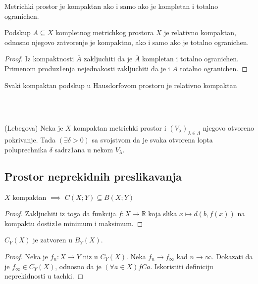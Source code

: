 \documentclass[a4paper,12pt]{article}
\newcommand{\RR}{\mathbb{R}}
\newcommand{\psj}{\subseteq}
\begin{document}
\begin{posl}
Metrichki prostor je kompaktan ako i samo ako je kompletan i totalno ogranichen.
\end{posl}

\begin{tvr}
Podskup $A \psj X$ kompletnog metrichkog prostora $X$ je relativno kompaktan, odnosno njegovo zatvorenje je kompaktno, ako i samo ako je totalno ogranichen.
\end{tvr}
\begin{proof}
Iz kompaktnosti $\overline{A}$ zakljuchiti da je $\overline{A}$ kompletan i totalno ogranichen. Primenom produz1enja nejednakosti zakljuchiti da je i $A$ totalno ogranichen.
\end{proof}

\begin{nap}
Svaki kompaktan podskup u Hausdorfovom prostoru je relativno kompaktan
\end{nap}
\\ \\
\begin{lema}(Lebegova)
Neka je $X$ kompaktan metrichki prostor i $(V_{\lambda})_{\lambda \in \Lambda}$ njegovo otvoreno pokrivanje. Tada $(\exists \delta > 0)$ sa svojstvom da je svaka otvorena lopta poluprechnika $\delta$ sadrz1ana u nekom $V_{\lambda}$.
\end{lema}

\subsection{Prostor neprekidnih preslikavanja}

\begin{tvr}
$X$ kompaktan $\implies$ $C(X;Y) \psj B(X;Y)$
\end{tvr}
\begin{proof}
Zakljuchiti iz toga da funkcija $f:X \to \RR$ koja slika $x\mapsto d(b,f(x))$ na kompaktu dostiz1e minimum i maksimum.
\end{proof}

\begin{tvr}
$C_Y(X)$ je zatvoren u $B_Y(X)$.
\end{tvr}
\begin{proof}
Neka je $f_n:X \to Y$ niz u $C_Y(X)$. Neka $f_n \longrightarrow f_{\infty}$ kad $n \to \infty$. Dokazati da je $f_{\infty} \in C_Y(X)$, odnosno da je $(\forall
a \in X) fCa$. Iskoristiti definiciju neprekidnosti u tachki.
\end{proof}
\end{document}
